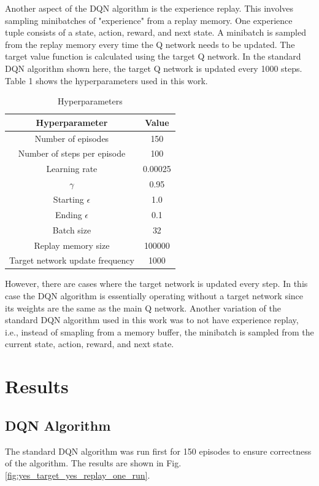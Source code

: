 \documentclass[conference]{IEEEtran}
\begin{document}
Another aspect of the DQN algorithm is the experience replay. This involves sampling minibatches of "experience" from a replay memory. One experience tuple consists of a state, action, reward, and next state. A minibatch is sampled from the replay memory every time the Q network needs to be updated. The target value function is calculated using the target Q network. In the standard DQN algorithm shown here, the target Q network is updated every 1000 steps. Table 1 shows the hyperparameters used in this work.

\begin{table}[htbp]
\centering
\caption{Hyperparameters}
\begin{tabular}{|c|c|}
\hline
\textbf{Hyperparameter} & \textbf{Value} \\ \hline
Number of episodes & 150 \\ \hline
Number of steps per episode & 100 \\ \hline
Learning rate & 0.00025 \\ \hline
$\gamma$ & 0.95 \\ \hline
Starting $\epsilon$ & 1.0 \\ \hline
Ending $\epsilon$ & 0.1 \\ \hline
Batch size & 32 \\ \hline
Replay memory size & 100000 \\ \hline
Target network update frequency & 1000 \\ \hline
\end{tabular}
\end{table}

However, there are cases where the target network is updated every step. In this case the DQN algorithm is essentially operating without a target network since its weights are the same as the main Q network. Another variation of the standard DQN algorithm used in this work was to not have experience replay, i.e., instead of smapling from a memory buffer, the minibatch is sampled from the current state, action, reward, and next state.

\section{Results}
\subsection{DQN Algorithm}
The standard DQN algorithm was run first for 150 episodes to ensure correctness of the algorithm. The results are shown in Fig. \ref{fig:yes_target_yes_replay_one_run}.
\end{document}
